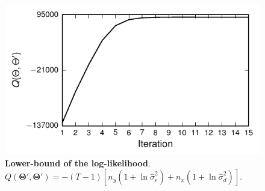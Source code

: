 \documentclass[]{article}
\begin{document}
\begin{figure}[!ht]
\begin{center}
\includegraphics{./Figures/Q.pdf}
\end{center}
\caption{{\bf Lower-bound of the log-likelihood}. $Q(\boldsymbol\Theta',\boldsymbol\Theta')=-(T-1)\left[n_y(1+\ln \hat{\sigma}^2_{\epsilon})+ n_x(1+\ln \hat{\sigma}^2_d)\right]$.}
\label{fig:LowerBound}
\end{figure}




% 
\end{document}
